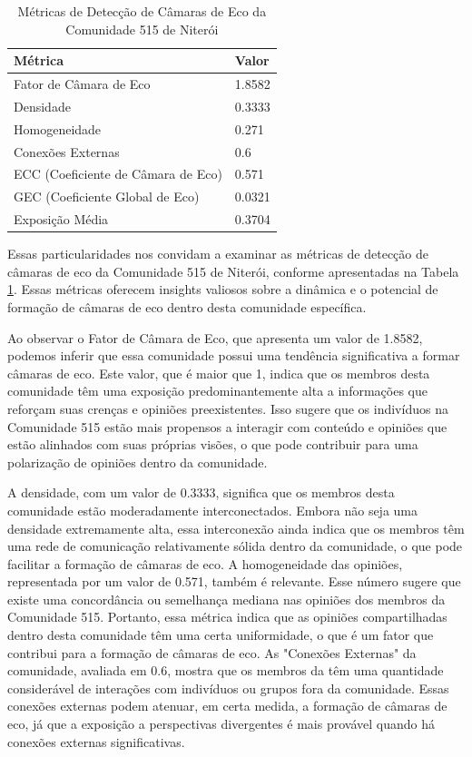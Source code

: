 \begin{table}[ht]
	\centering
	\caption{Métricas de Detecção de Câmaras de Eco da Comunidade 515 de Niterói}
	\label{tab:echo-chamber-metrics-community515}
	\begin{tabular}{l|l}
		\toprule
		\textbf{Métrica}                   & \textbf{Valor} \\
		\midrule
		Fator de Câmara de Eco             & 1.8582         \\
		Densidade                          & 0.3333         \\
		Homogeneidade                      & 0.271          \\
		Conexões Externas                  & 0.6            \\
		ECC (Coeficiente de Câmara de Eco) & 0.571          \\
		GEC (Coeficiente Global de Eco)    & 0.0321         \\
		Exposição Média                    & 0.3704         \\
		\bottomrule
	\end{tabular}
\end{table}

Essas particularidades nos convidam a examinar as métricas de detecção de câmaras de eco da Comunidade 515 de Niterói, conforme apresentadas na Tabela \ref{tab:echo-chamber-metrics-community515}. Essas métricas oferecem insights valiosos sobre a dinâmica e o potencial de formação de câmaras de eco dentro desta comunidade específica.

Ao observar o Fator de Câmara de Eco, que apresenta um valor de 1.8582, podemos inferir que essa comunidade possui uma tendência significativa a formar câmaras de eco. Este valor, que é maior que 1, indica que os membros desta comunidade têm uma exposição predominantemente alta a informações que reforçam suas crenças e opiniões preexistentes. Isso sugere que os indivíduos na Comunidade 515 estão mais propensos a interagir com conteúdo e opiniões que estão alinhados com suas próprias visões, o que pode contribuir para uma polarização de opiniões dentro da comunidade.

A densidade, com um valor de 0.3333, significa que os membros desta comunidade estão moderadamente interconectados. Embora não seja uma densidade extremamente alta, essa interconexão ainda indica que os membros têm uma rede de comunicação relativamente sólida dentro da comunidade, o que pode facilitar a formação de câmaras de eco. A homogeneidade das opiniões, representada por um valor de 0.571, também é relevante. Esse número sugere que existe uma concordância ou semelhança mediana nas opiniões dos membros da Comunidade 515. Portanto, essa métrica indica que as opiniões compartilhadas dentro desta comunidade têm uma certa uniformidade, o que é um fator que contribui para a formação de câmaras de eco. As "Conexões Externas" da comunidade, avaliada em 0.6, mostra que os membros da têm uma quantidade considerável de interações com indivíduos ou grupos fora da comunidade. Essas conexões externas podem atenuar, em certa medida, a formação de câmaras de eco, já que a exposição a perspectivas divergentes é mais provável quando há conexões externas significativas.

